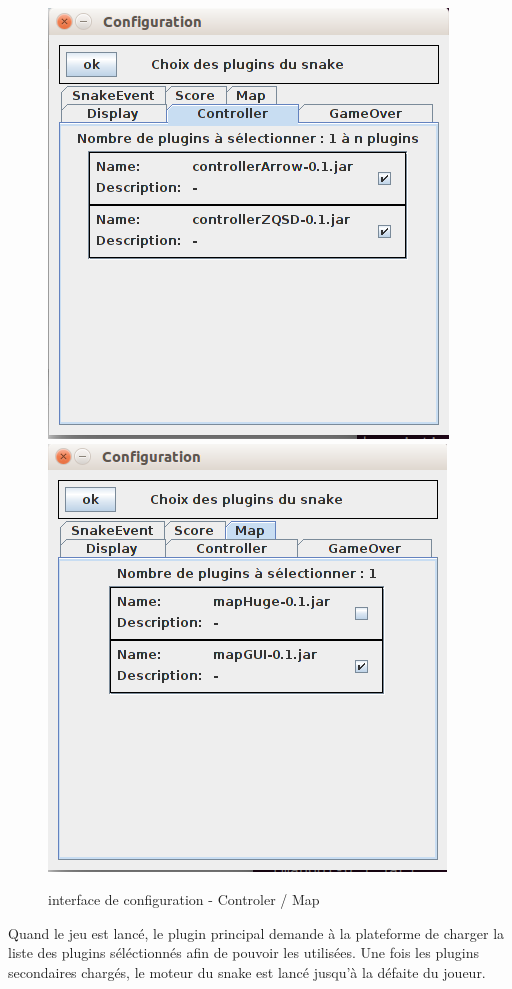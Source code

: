 \documentclass[12pt,a4paper]{article}
\begin{document}
\begin{figure}[h]
    \centering
    \includegraphics[scale=0.4]{ressourcesSnake/configurationControler.png}
    \includegraphics[scale=0.4]{ressourcesSnake/configurationMap.png}
    \caption{interface de configuration - Controler / Map}
\end{figure}       
    
    Quand le jeu est lancé, le plugin principal demande à la plateforme de charger la liste des plugins séléctionnés afin de pouvoir les utilisées. Une fois les plugins secondaires chargés, le moteur du snake est lancé jusqu'à la défaite du joueur. \\
\end{document}
